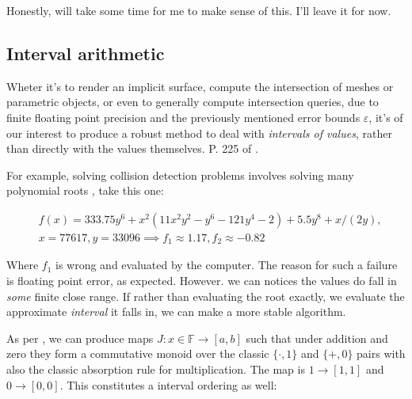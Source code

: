 Honestly, will take some time for me to make sense of this. I'll leave it
for now.


\subsection{Interval arithmetic}

Wheter it's to render an implicit surface, compute the intersection
of meshes or parametric objects, or even to generally compute
intersection queries, due to finite floating point precision and
the previously mentioned error bounds $\varepsilon$, it's of our
interest to produce a robust method to deal with \emph{intervals
of values}, rather than directly with the values themselves.
P. 225 of \cite{artof1}.

\spa

For example, solving collision detection problems involves
solving many polynomial roots \cite{inter2}, take this one:

\begin{align*}
 &f(x) = 333.75y^6 + x^2(11x^2y^2 - y^6 - 121y^4 - 2) + 5.5y^8 + x/(2y), 
 \\
 &x = 77617, y = 33096 \implies f_1 \approx 1.17, f_2 \approx -0.82
\end{align*}

Where $f_1$ is wrong and evaluated by the computer. 
The reason for such a failure is floating point error, as expected.
However. we can notices the values do fall in \emph{some} finite close
range. If rather than evaluating the root exactly, we evaluate the
approximate \emph{interval} it falls in, we can make a more stable
algorithm.

\spa

As per \cite{inter1}, we can produce maps $J:x \in \mathbb{F}\rightarrow
[a,b]$ such that under addition and zero they form a commutative monoid
over the classic $\{\cdot, 1\}$ and $\{+,0\}$ pairs with also the classic
absorption rule for multiplication. The map is $1\rightarrow[1,1]$ and
$0\rightarrow[0,0]$. This constitutes a interval ordering as well:


